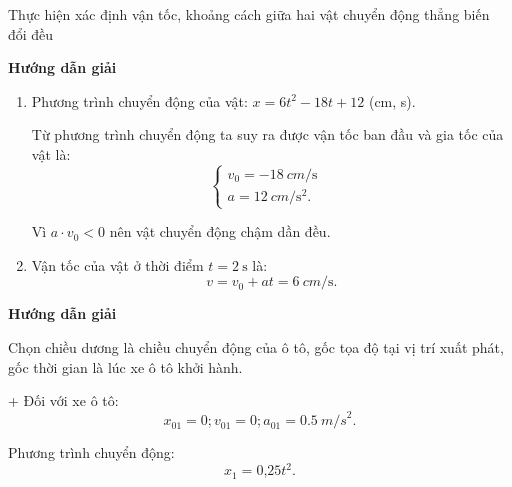 \begin{dang}{Thực hiện xác định vận tốc, khoảng cách giữa hai vật chuyển động thẳng biến đổi đều}
	{	\begin{center}
			\textbf{Hướng dẫn giải}
		\end{center}
		
		\begin{enumerate}[label=\alph*)]
			\item
			Phương trình chuyển động của vật: $x=6t^2-18t+12$ (cm, s).
			
			Từ phương trình chuyển động ta suy ra được vận tốc ban đầu và gia tốc của vật là:
			\begin{equation*}
				\left\{\begin{array}{ll}{v_0=\SI{-18}{cm/\second}}&\\{a=\SI{12}{cm/\second^2}.}&\end{array}\right.
			\end{equation*}
			
			Vì $a\cdot v_0 < 0$ nên vật chuyển động chậm dần đều.
			\item 
			Vận tốc của vật ở thời điểm $t=\SI{2}{\second}$ là:
			\begin{equation*}
				v=v_0+at=\SI{6}{cm/\second}.
			\end{equation*}
		\end{enumerate}
	}
	{	\begin{center}
			\textbf{Hướng dẫn giải}
		\end{center}
		
		Chọn chiều dương là chiều chuyển động của ô tô, gốc tọa độ tại vị trí xuất phát, gốc thời gian là lúc xe ô tô khởi hành.
		
		+ Đối với xe ô tô:
		$$x_{01} = 0; v_{01} = 0; a_{01} = \SI{0,5}{m/s}^2.$$	
		
		Phương trình chuyển động:
		$$x_1 = \text{0,25}t^2.$$
		
}
\end{dang}
